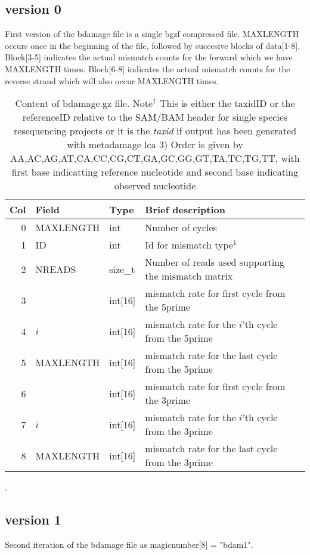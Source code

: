 \documentclass[10pt]{article}
\begin{document}
\subsection{version 0}
First version of the bdamage file is a single bgzf compressed file. MAXLENGTH occurs once in the beginning of the file, followed by succesive blocks of data[1-8]. Block[3-5] indicates the actual mismatch counts for the forward which we have MAXLENGTH times. Block[6-8] indicates the actual mismatch counts for the reverse strand which will also occur MAXLENGTH times. 
\begin{table}[h!]
\begin{tabular}{rllll}
  \hline
  {\bf Col} & {\bf Field} & {\bf Type} & {\bf Brief description} \\
  \hline
  0 & {\sf MAXLENGTH} & int &  Number of cycles\\\hline
  1 & {\sf ID} & int &  Id for mismatch type$^1$\\
  2 & {\sf NREADS} & size\_t & Number of reads used supporting the mismatch matrix\\\hline\hline
  3 & {\sf 1} & int[16] & mismatch rate for first cycle from the 5prime\\
  4 & {\sf $i$} & int[16] & mismatch rate for the $i$'th cycle from the 5prime\\
  5 & {\sf MAXLENGTH} & int[16] & mismatch rate for the last cycle from the 5prime\\\hline
  6 & {\sf 1} & int[16] & mismatch rate for first cycle from the 3prime\\
  7 & {\sf $i$} & int[16] & mismatch rate for the $i$'th cycle from the 3prime\\
  8 & {\sf MAXLENGTH} & int[16] & mismatch rate for the last cycle from the 3prime\\\hline
  \hline
\end{tabular}\label{tab1}
\caption{Content of bdamage.gz file. Note$^1$ This is either the taxidID or the referenceID relative to the SAM/BAM header for single species resequencing projects or it is the \textit{taxid} if output has been generated with metadamage lca 3) Order is given by AA,AC,AG,AT,CA,CC,CG,CT,GA,GC,GG,GT,TA,TC,TG,TT, with first base indicatting reference nucleotide and second base indicating observed nucleotide}.
\end{table}

\subsection{version 1}
Second iteration of the bdamage file as magicnumber[8] = "bdam1".
\clearpage
\end{document}
